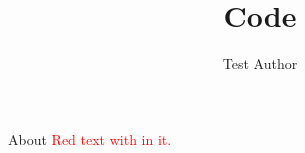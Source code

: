 \documentclass[aspectratio=43,9pt]{beamer}
\title{Code}
\author{Test Author}
\begin{document}
\begin{frame}{About }
	\textcolor{red}{Red text with  in it.}
\end{frame}
\end{document}

